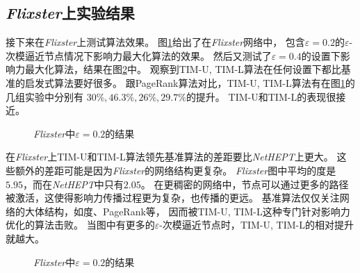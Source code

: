 \subsection{{\em Flixster}上实验结果}

接下来在{\em Flixster}上测试算法效果。
图\ref{fig:Flixster_2}给出了在{\em Flixster}网络中，
包含$\varepsilon=0.2$的$\varepsilon$-次模逼近节点情况下影响力最大化算法的效果。
然后又测试了$\varepsilon=0.4$的设置下影响力最大化算法，结果在图\ref{fig:Flixster_4}中。
观察到{\sf TIM-U, TIM-L}算法在任何设置下都比基准的启发式算法要好很多。
跟{\sf PageRank}算法对比，{\sf TIM-U, TIM-L}算法有在图\ref{fig:Flixster_2}的几组实验中分别有
$30\%,46.3\%,26\%,29.7\%$的提升。
{\sf TIM-U}和{\sf TIM-L}的表现很接近。


\begin{figure}[h]
\centering
	\caption{{\em Flixster}中$\varepsilon=0.2$的结果}
	\label{fig:Flixster_2}
\end{figure}

在{\em Flixster}上{\sf TIM-U}和{\sf TIM-L}算法领先基准算法的差距要比{\em NetHEPT}上更大。
这些额外的差距可能是因为{\em Flixster}的网络结构更复杂。
{\em Flixster}图中平均的度是 $5.95$，而在{\em NetHEPT}中只有$2.05$。
在更稠密的网络中，节点可以通过更多的路径被激活，这使得影响力传播过程更为复杂，也传播的更远。
基准算法仅仅关注网络的大体结构，如度、PageRank等，
因而被{\sf TIM-U, TIM-L}这种专门针对影响力优化的算法击败。
当图中有更多的$\varepsilon$-次模逼近节点时，{\sf TIM-U, TIM-L}的相对提升就越大。


\begin{figure}[h]
\centering
	\caption{{\em Flixster}中$\varepsilon=0.2$的结果}
	\label{fig:Flixster_4}
\end{figure}

